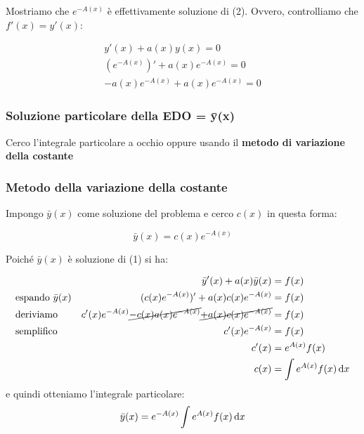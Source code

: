 Mostriamo che \(e ^{-A(x)}\) è effettivamente soluzione di (2). Ovvero, controlliamo che \(f'(x) = y'(x)\):
\medskip
\begin{spreadlines}{3mm}
    \begin{align*}
        y'(x) + a(x)y(x) = 0             \\
        (e^{-A(x)})' + a(x)e^{-A(x)} = 0 \\
        -a(x)e^{-A(x)} + a(x)e^{-A(x)} = 0
    \end{align*}
\end{spreadlines}

\pagebreak
\subsubsection{Soluzione particolare della EDO = ȳ(x)}

Cerco l'integrale particolare a occhio oppure usando il \textbf{metodo di variazione della costante}

\subsubsection*{Metodo della variazione della costante}

Impongo \(\bar y(x)\) come soluzione del problema e cerco \(c(x)\) in questa forma:

\[
    \bar y(x) = c(x) e ^{-A(x)}
\]

Poiché \(\bar y(x)\) è soluzione di (1) si ha:

\begin{align*}
     &                            & \bar y'(x)+a(x) \bar y(x)                                                        & = f(x)                        \\
     & \text{espando}\ \bar{y}(x) & (c(x) e ^{-A(x)})'+ a(x) c(x) e ^{-A(x)}                                         & = f(x)                        \\
     & \text{deriviamo}           & c'(x) e ^{-A(x)} \cancel{- c(x) a(x) e ^{-A(x)}} \cancel{+ a(x) c(x) e ^{-A(x)}} & = f(x)                        \\
     & \text{semplifico}          & c'(x) e ^{-A(x)}                                                                 & = f(x)                        \\
     &                            & c'(x)                                                                            & = e ^{A(x)} f(x)              \\
     &                            & c(x)                                                                             & = \int e ^{A(x)} f(x) \mathop{}\!\mathrm{d} x
\end{align*}
e quindi otteniamo l'integrale particolare:
\[
    \bar y(x) = e ^{-A(x)} \int e^{A(x)} f(x) \mathop{}\!\mathrm{d} x
\]

